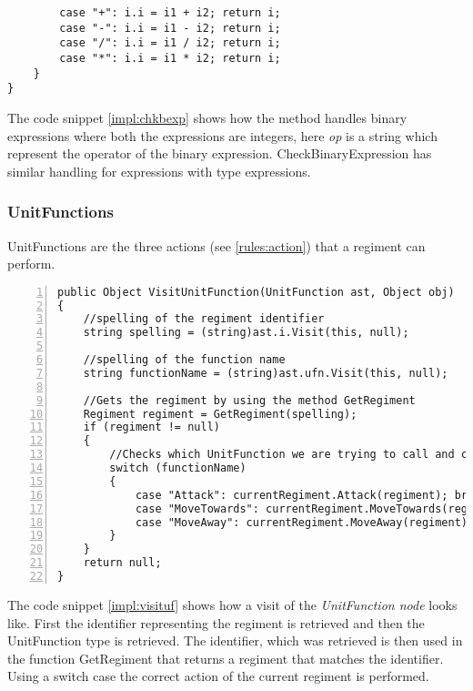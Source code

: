 {\begin{lstlisting}
		case "+": i.i = i1 + i2; return i;
		case "-": i.i = i1 - i2; return i;
		case "/": i.i = i1 / i2; return i;
		case "*": i.i = i1 * i2; return i;
	}
}
		\end{lstlisting}
		The code snippet \ref{impl:chkbexp} shows how the method handles binary expressions 
		where both the expressions are integers, here {\it op} is a string which represent the operator of the binary expression. 
		CheckBinaryExpression has similar handling for expressions with type expressions.
		
	\subsubsection{UnitFunctions}
		UnitFunctions are the three actions (see \ref{rules:action}) that a regiment can perform.
		\begin{lstlisting}[basicstyle=\small\sffamily,
			keywords={break,case,const,continue,default,else,enum,
			for,if,return,switch,while,do,long,void,int,float,double,
			char,struct,typedef,include,size\_t},
			keywordstyle={\color{blue}},
			comment={[l]{//}}, morecomment={[s]{/*}{*/}}, commentstyle=\itshape,
			columns={[l]flexible}, numbers=left, numberstyle=\tiny,
			frameround=fftt, frame=shadowbox, captionpos=b,
			caption={VisitUnitFunction from the class },
			label=impl:visituf]	
public Object VisitUnitFunction(UnitFunction ast, Object obj)
{
	//spelling of the regiment identifier
	string spelling = (string)ast.i.Visit(this, null);
	
	//spelling of the function name
	string functionName = (string)ast.ufn.Visit(this, null);
	
	//Gets the regiment by using the method GetRegiment
	Regiment regiment = GetRegiment(spelling);
	if (regiment != null)
	{
		//Checks which UnitFunction we are trying to call and calls it from the regiment class
		switch (functionName)
		{
			case "Attack": currentRegiment.Attack(regiment); break;
			case "MoveTowards": currentRegiment.MoveTowards(regiment); break;
			case "MoveAway": currentRegiment.MoveAway(regiment); break;
		}
	}
	return null;
}		\end{lstlisting}
		The code snippet \ref{impl:visituf} shows how a visit of the {\it UnitFunction node} looks like. 
		First the identifier representing the regiment is retrieved and then the UnitFunction type is retrieved.
		The identifier, which was retrieved is then used in the function GetRegiment that returns a regiment that matches the identifier.
		Using a switch case the correct action of the current regiment is performed.
		
}
